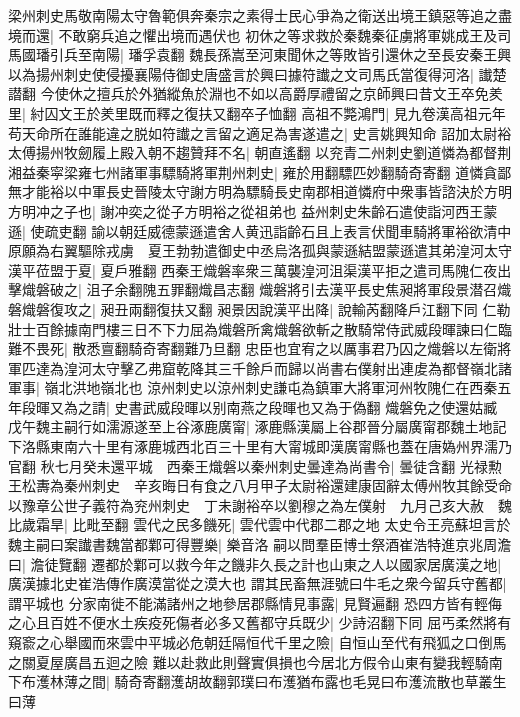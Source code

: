 梁州刺史馬敬南陽太守魯範俱奔秦宗之素得士民心爭為之衛送出境王鎮惡等追之盡境而還|{
	不敢窮兵追之懼出境而遇伏也}
初休之等求救於秦魏秦征虜將軍姚成王及司馬國璠引兵至南陽|{
	璠孚袁翻}
魏長孫嵩至河東聞休之等敗皆引還休之至長安秦王興以為揚州刺史使侵擾襄陽侍御史唐盛言於興曰據符䜟之文司馬氏當復得河洛|{
	䜟楚譛翻}
今使休之擅兵於外猶縱魚於淵也不如以高爵厚禮留之京師興曰昔文王卒免羑里|{
	紂囚文王於羑里既而釋之復扶又翻卒子恤翻}
高祖不斃鴻門|{
	見九卷漢高祖元年}
苟天命所在誰能違之脱如符䜟之言留之適足為害遂遣之|{
	史言姚興知命}
詔加太尉裕太傅揚州牧劒履上殿入朝不趨贊拜不名|{
	朝直遙翻}
以兖青二州刺史劉道憐為都督荆湘益秦寜梁雍七州諸軍事驃騎將軍荆州刺史|{
	雍於用翻驃匹妙翻騎奇寄翻}
道憐貪鄙無才能裕以中軍長史晉陵太守謝方明為驃騎長史南郡相道憐府中衆事皆諮決於方明方明冲之子也|{
	謝冲奕之從子方明裕之從祖弟也}
益州刺史朱齡石遣使詣河西王蒙遜|{
	使疏吏翻}
諭以朝廷威德蒙遜遣舍人黄迅詣齡石且上表言伏聞車騎將軍裕欲清中原願為右翼驅除戎虜　夏王勃勃遣御史中丞烏洛孤與蒙遜結盟蒙遜遣其弟湟河太守漢平莅盟于夏|{
	夏戶雅翻}
西秦王熾磐率衆三萬襲湟河沮渠漢平拒之遣司馬隗仁夜出擊熾磐破之|{
	沮子余翻隗五罪翻熾昌志翻}
熾磐將引去漢平長史焦昶將軍段景潜召熾磐熾磐復攻之|{
	昶丑兩翻復扶又翻}
昶景因說漢平出降|{
	說輸芮翻降戶江翻下同}
仁勒壯士百餘據南門樓三日不下力屈為熾磐所禽熾磐欲斬之散騎常侍武威段暉諫曰仁臨難不畏死|{
	散悉亶翻騎奇寄翻難乃旦翻}
忠臣也宜宥之以厲事君乃囚之熾磐以左衛將軍匹達為湟河太守擊乙弗窟乾降其三千餘戶而歸以尚書右僕射出連䖍為都督嶺北諸軍事|{
	嶺北洪地嶺北也}
涼州刺史以涼州刺史謙屯為鎮軍大將軍河州牧隗仁在西秦五年段暉又為之請|{
	史書武威段暉以别南燕之段暉也又為于偽翻}
熾磐免之使還姑臧　戊午魏主嗣行如濡源遂至上谷涿鹿廣甯|{
	涿鹿縣漢屬上谷郡晉分屬廣甯郡魏土地記下洛縣東南六十里有涿鹿城西北百三十里有大甯城即漢廣甯縣也蓋在唐媯州界濡乃官翻}
秋七月癸未還平城　西秦王熾磐以秦州刺史曇達為尚書令|{
	曇徒含翻}
光禄勲王松夀為秦州刺史　辛亥晦日有食之八月甲子太尉裕還建康固辭太傅州牧其餘受命以豫章公世子義符為兖州刺史　丁未謝裕卒以劉穆之為左僕射　九月己亥大赦　魏比歲霜旱|{
	比毗至翻}
雲代之民多饑死|{
	雲代雲中代郡二郡之地}
太史令王亮蘇坦言於魏主嗣曰案䜟書魏當都鄴可得豐樂|{
	樂音洛}
嗣以問羣臣博士祭酒崔浩特進京兆周澹曰|{
	澹徒覽翻}
遷都於鄴可以救今年之饑非久長之計也山東之人以國家居廣漢之地|{
	廣漢據北史崔浩傳作廣漠當從之漠大也}
謂其民畜無涯號曰牛毛之衆今留兵守舊都|{
	謂平城也}
分家南徙不能滿諸州之地參居郡縣情見事露|{
	見賢遍翻}
恐四方皆有輕侮之心且百姓不便水土疾疫死傷者必多又舊都守兵既少|{
	少詩沼翻下同}
屈丐柔然將有窺窬之心舉國而來雲中平城必危朝廷隔恒代千里之險|{
	自恒山至代有飛狐之口倒馬之關夏屋廣昌五迴之險}
難以赴救此則聲實俱損也今居北方假令山東有變我輕騎南下布濩林薄之間|{
	騎奇寄翻濩胡故翻郭璞曰布濩猶布露也毛晃曰布濩流散也草叢生曰薄}
